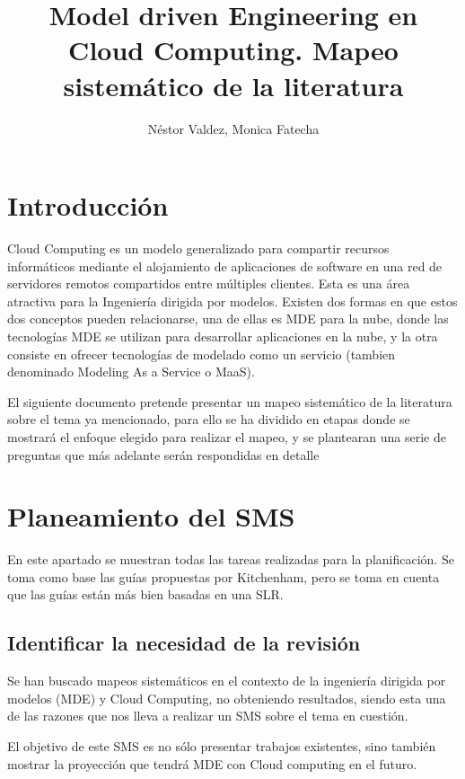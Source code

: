 \documentclass{llncs}
\begin{document}
\title{Model driven Engineering en Cloud Computing. Mapeo sistemático de la literatura}

\author{Néstor Valdez, Monica Fatecha}
\maketitle


\section{Introducción}\label{sec:Introduction}
Cloud Computing es un modelo generalizado para compartir recursos informáticos mediante el alojamiento de aplicaciones
de software en una red de servidores remotos compartidos entre múltiples clientes. Esta es una área atractiva para la Ingeniería
dirigida por modelos. Existen dos formas en que estos dos conceptos pueden relacionarse, una de ellas es MDE para la nube, donde las
tecnologías MDE se utilizan para desarrollar aplicaciones en la nube, y la otra consiste en ofrecer tecnologías de modelado como un servicio
(tambien denominado Modeling As a Service o MaaS).

El siguiente documento pretende presentar un mapeo sistemático de la literatura sobre el tema ya mencionado, para ello se ha dividido
en etapas donde se mostrará el enfoque elegido para realizar el mapeo, y se plantearan una serie de preguntas que más adelante serán respondidas en detalle
\section{Planeamiento del SMS}\label{sec:Planning}
En este apartado se muestran todas las tareas realizadas para la planificación. Se toma como base las guías propuestas por
Kitchenham\cite{slr}, pero se toma en cuenta que las guías están más bien basadas en una SLR.
\subsection{Identificar la necesidad de la revisión}
Se han buscado mapeos sistemáticos en el contexto de la ingeniería dirigida por modelos (MDE) y Cloud Computing, no obteniendo
resultados, siendo esta una de las razones que nos lleva a realizar un SMS sobre el tema en cuestión.

El objetivo de este SMS es no sólo presentar trabajos existentes, sino también mostrar la proyección que tendrá MDE con Cloud computing
en el futuro.
\end{document}

